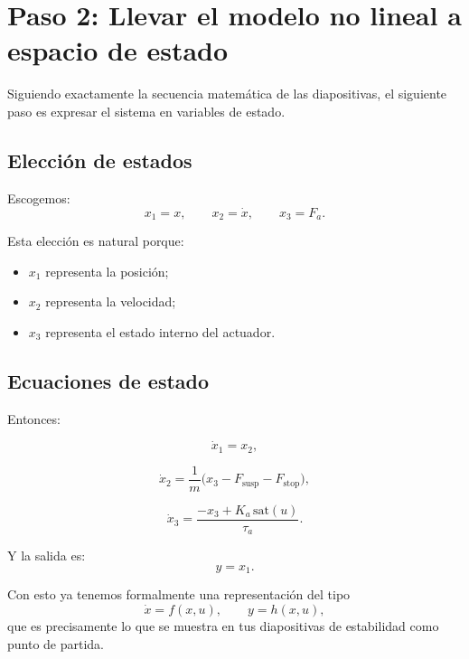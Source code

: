 \documentclass[11pt]{article}
\begin{document}
\section{Paso 2: Llevar el modelo no lineal a espacio de estado}

Siguiendo exactamente la secuencia matem\'atica de las diapositivas, el siguiente paso es expresar el sistema en variables de estado.

\subsection{Elecci\'on de estados}

Escogemos:
\begin{equation}
x_1 = x, \qquad x_2 = \dot{x}, \qquad x_3 = F_a.
\end{equation}

Esta elecci\'on es natural porque:

\begin{itemize}[leftmargin=1.2cm]
\item $x_1$ representa la posici\'on;
\item $x_2$ representa la velocidad;
\item $x_3$ representa el estado interno del actuador.
\end{itemize}

\subsection{Ecuaciones de estado}

Entonces:

\begin{equation}
\dot{x}_1 = x_2,
\end{equation}

\begin{equation}
\dot{x}_2 =
\frac{1}{m}\Big(
x_3 - F_{\text{susp}} - F_{\text{stop}}
\Big),
\end{equation}

\begin{equation}
\dot{x}_3 =
\frac{-x_3 + K_a\,\mathrm{sat}(u)}{\tau_a}.
\end{equation}

Y la salida es:
\begin{equation}
y = x_1.
\end{equation}

Con esto ya tenemos formalmente una representaci\'on del tipo
\[
\dot{x}=f(x,u), \qquad y=h(x,u),
\]
que es precisamente lo que se muestra en tus diapositivas de estabilidad como punto de partida.
\end{document}
